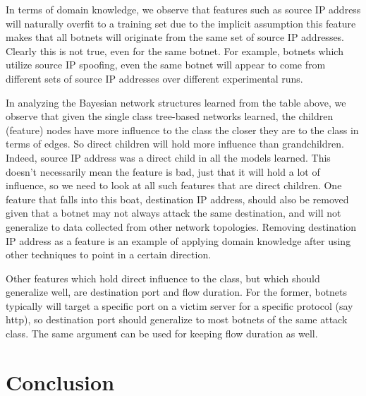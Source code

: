 \documentclass[letterpaper]{article}
\begin{document}
In terms of domain knowledge, we observe that features such as source IP address will naturally overfit to a training set due to the implicit assumption this feature makes that all botnets will originate from the same set of source IP addresses.  Clearly this is not true, even for the same botnet.  For example, botnets which utilize source IP spoofing, even the same botnet will appear to come from different sets of source IP addresses over different experimental runs.

In analyzing the Bayesian network structures learned from the table above, we observe that given the single class tree-based networks learned, the children (feature) nodes have more influence to the class the closer they are to the class in terms of edges.  So direct children will hold more influence than grandchildren.  Indeed, source IP address was a direct child in all the models learned.  This doesn't necessarily mean the feature is bad, just that it will hold a lot of influence, so we need to look at all such features that are direct children.  One feature that falls into this boat, destination IP address, should also be removed given that a botnet may not always attack the same destination, and will not generalize to data collected from other network topologies. Removing destination IP address as a feature is an example of applying domain knowledge after using other techniques to point in a certain direction.

Other features which hold direct influence to the class, but which should generalize well, are destination port and flow duration. For the former, botnets typically will target a specific port on a victim server for a specific protocol (say http), so destination port should generalize to most botnets of the same attack class.  The same argument can be used for keeping flow duration as well.

\section{Conclusion}



\end{document}
